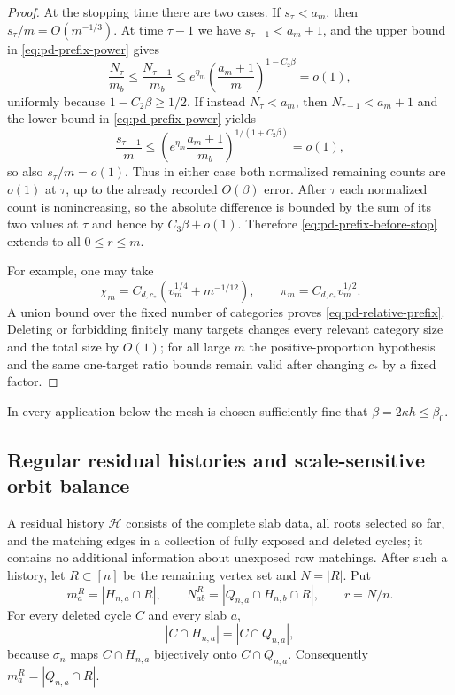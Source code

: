 \documentclass[11pt]{article}
\theoremstyle{remark}
\begin{document}
\begin{proof}
At the stopping time there are two cases.  If $s_\tau<a_m$, then
$s_\tau/m=O(m^{-1/3})$.  At time $\tau-1$ we have
$s_{\tau-1}<a_m+1$, and the upper bound in
\eqref{eq:pd-prefix-power} gives
\[
 \frac{N_\tau}{m_b}
 \le \frac{N_{\tau-1}}{m_b}
 \le e^{\eta_m}\left(\frac{a_m+1}{m}\right)^{1-C_2\beta}
 =o(1),
\]
uniformly because $1-C_2\beta\ge1/2$.  If instead $N_\tau<a_m$, then
$N_{\tau-1}<a_m+1$ and the lower bound in
\eqref{eq:pd-prefix-power} yields
\[
 \frac{s_{\tau-1}}m
 \le\left(e^{\eta_m}\frac{a_m+1}{m_b}\right)^{1/(1+C_2\beta)}
 =o(1),
\]
so also $s_\tau/m=o(1)$.  Thus in either case both normalized remaining
counts are $o(1)$ at $\tau$, up to the already recorded $O(\beta)$ error.
After $\tau$ each normalized count is nonincreasing, so the absolute
difference is bounded by the sum of its two values at $\tau$ and hence by
$C_3\beta+o(1)$.  Therefore
\eqref{eq:pd-prefix-before-stop} extends to all $0\le r\le m$.

For example, one may take
\[
 \chi_m=C_{d,c_*}\left(v_m^{1/4}+m^{-1/12}\right),
 \qquad
 \pi_m=C_{d,c_*}v_m^{1/2}.
\]
A union bound over the fixed number of categories proves
\eqref{eq:pd-relative-prefix}.  Deleting or forbidding finitely many targets
changes every relevant category size and the total size by $O(1)$; for all
large $m$ the positive-proportion hypothesis and the same one-target ratio
bounds remain valid after changing $c_*$ by a fixed factor.
\end{proof}

In every application below the mesh is chosen sufficiently fine that
$\beta=2\kappa h\le\beta_0$.

\subsection{Regular residual histories and scale-sensitive orbit balance}

A residual history $\mathcal H$ consists of the complete slab data, all roots
selected so far, and the matching edges in a collection of fully exposed and
deleted cycles; it contains no additional information about unexposed row
matchings.  After such a history, let $R\subset[n]$ be the remaining vertex set
and $N=|R|$.  Put
\[
 m_a^R=|H_{n,a}\cap R|,
 \qquad N_{ab}^R=|Q_{n,a}\cap H_{n,b}\cap R|,
 \qquad r=N/n.
\]
For every deleted cycle $C$ and every slab $a$,
\begin{equation}
        |C\cap H_{n,a}|=|C\cap Q_{n,a}|,
        \label{eq:pd-cycle-block-equality}
\end{equation}
because $\sigma_n$ maps $C\cap H_{n,a}$ bijectively onto
$C\cap Q_{n,a}$.  Consequently $m_a^R=|Q_{n,a}\cap R|$.
\end{document}
